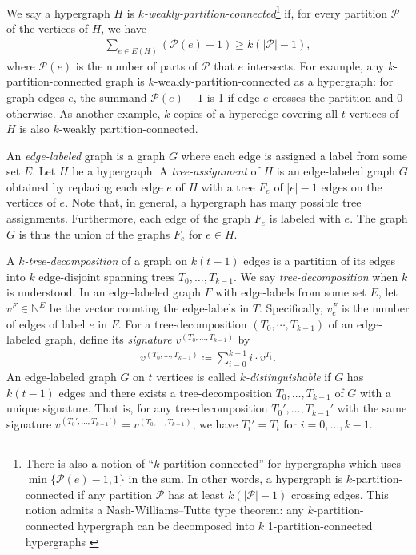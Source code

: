 \documentclass[11pt]{article}
\newcommand\black[1]{{\color{black} #1}}
\begin{document}
We say a hypergraph $H$ is \emph{$k$-weakly-partition-connected}\footnote{There is also a notion of ``$k$-partition-connected'' for hypergraphs which uses $\min\{\mathcal{P}(e)-1,1\}$ in the sum. In other words, a hypergraph is $k$-partition-connected if any partition $\mathcal{P}$ has at least $k(|\mathcal{P}|-1)$ crossing edges. This notion admits a Nash-Williams--Tutte type theorem: any $k$-partition-connected hypergraph can be decomposed into $k$ 1-partition-connected hypergraphs \cite{frank2003decomposing}} if, for every partition $\mathcal{P}$ of the vertices of $H$, we have
  \begin{align}
    \label{eq:weak-part}
    \sum_{e\in E(H)}^{} (\mathcal{P}(e)-1)\ge k(|\mathcal{P}|-1),
  \end{align}
  where $\mathcal{P}(e)$ is the
number of parts of $\mathcal{P}$ that $e$ intersects.
For example, any $k$-partition-connected graph is $k$-weakly-partition-connected as a hypergraph: \black{for graph edges $e$, the summand $\mathcal{P}(e)-1$ is 1 if edge $e$ crosses the partition and 0 otherwise}. As another example, $k$ copies of a hyperedge covering all $t$ vertices of $H$ is also $k$-weakly partition-connected.

An \emph{edge-labeled} graph is a graph $G$ where each edge is assigned a label from some set $E$.
Let $H$ be a hypergraph.
A \emph{tree-assignment} of $H$ is an edge-labeled graph $G$ obtained by replacing each edge $e$ of $H$ with a tree $F_e$ of $|e|-1$ edges on the vertices of $e$.
\black{Note that, in general, a hypergraph has many possible tree assignments.}
Furthermore, each edge of the graph $F_e$ is labeled with $e$.
The graph $G$ is thus the union of the graphs $F_e$ for $e\in H$.

  A \emph{$k$-tree-decomposition} of a graph on $k(t-1)$ edges is a partition of its edges into $k$ edge-disjoint spanning trees $T_0,\dots,T_{k-1}$.
  We say \emph{tree-decomposition} when $k$ is understood.
  \black{In an edge-labeled graph $F$ with edge-labels from some set $E$, let $v^F\in\mathbb{N}^{E}$ be the vector counting the edge-labels in $T$.
  Specifically, $v^F_e$ is the number of edges of label $e$ in $F$.}
  For a tree-decomposition $(T_0,\cdots,T_{k-1})$ of an edge-labeled graph, define its \emph{signature} $v^{(T_0,\dots,T_{k-1})}$ by
  \begin{align}
    \label{eq:signature}
    v^{(T_0,\dots,T_{k-1})}\coloneqq \sum_{i=0}^{k-1} i\cdot v^{T_i}.
  \end{align}
  An edge-labeled graph $G$ on $t$ vertices is called \emph{$k$-distinguishable} if $G$ has $k(t-1)$ edges and there exists a tree-decomposition $T_0,\dots,T_{k-1}$ of $G$ with a unique signature.
  That is, for any tree-decomposition $T_0',\dots,T_{k-1}'$ with the same signature $v^{(T_0',\dots,T_{k-1}')}= v^{(T_0,\dots,T_{k-1})}$, we have $T_i'=T_i$ for $i=0,\dots,k-1$.
\end{document}
